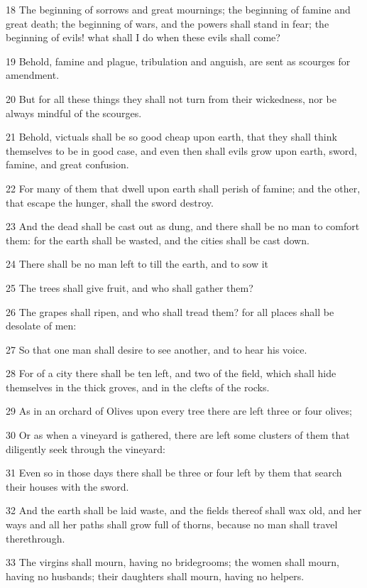 \par 18 The beginning of sorrows and great mournings; the beginning of famine and great death; the beginning of wars, and the powers shall stand in fear; the beginning of evils! what shall I do when these evils shall come?
\par 19 Behold, famine and plague, tribulation and anguish, are sent as scourges for amendment.
\par 20 But for all these things they shall not turn from their wickedness, nor be always mindful of the scourges.
\par 21 Behold, victuals shall be so good cheap upon earth, that they shall think themselves to be in good case, and even then shall evils grow upon earth, sword, famine, and great confusion.
\par 22 For many of them that dwell upon earth shall perish of famine; and the other, that escape the hunger, shall the sword destroy.
\par 23 And the dead shall be cast out as dung, and there shall be no man to comfort them: for the earth shall be wasted, and the cities shall be cast down.
\par 24 There shall be no man left to till the earth, and to sow it
\par 25 The trees shall give fruit, and who shall gather them?
\par 26 The grapes shall ripen, and who shall tread them? for all places shall be desolate of men:
\par 27 So that one man shall desire to see another, and to hear his voice.
\par 28 For of a city there shall be ten left, and two of the field, which shall hide themselves in the thick groves, and in the clefts of the rocks.
\par 29 As in an orchard of Olives upon every tree there are left three or four olives;
\par 30 Or as when a vineyard is gathered, there are left some clusters of them that diligently seek through the vineyard:
\par 31 Even so in those days there shall be three or four left by them that search their houses with the sword.
\par 32 And the earth shall be laid waste, and the fields thereof shall wax old, and her ways and all her paths shall grow full of thorns, because no man shall travel therethrough.
\par 33 The virgins shall mourn, having no bridegrooms; the women shall mourn, having no husbands; their daughters shall mourn, having no helpers.
